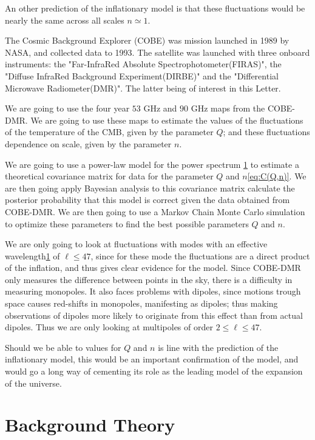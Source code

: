 \documentclass{emulateapj}
\begin{document}
An other prediction of the inflationary model is that these fluctuations would be nearly the same across all scales $n\simeq1$\citep{zeldovich}. 

The Cosmic Background Explorer (COBE) was mission launched in 1989 by NASA, and collected data to 1993. The satellite was launched with three onboard instruments: the "Far-InfraRed Absolute Spectrophotometer(FIRAS)", the "Diffuse InfraRed Background Experiment(DIRBE)" and the "Differential Microwave Radiometer(DMR)". The latter being of interest in this Letter.

We are going to use the four year $53$ GHz and $90$ GHz maps from the COBE-DMR. We are going to use these maps to estimate the values of the fluctuations of the temperature of the CMB, given by the parameter $Q$; and these fluctuations dependence on scale, given by the parameter $n$.

We are going to use a power-law model for the power spectrum \ref{sec:theory} to estimate a theoretical covariance matrix for data for the parameter $Q$ and $n$\eqref{eq:C(Q,n)}. We are then going apply Bayesian analysis to this covariance matrix calculate the posterior probability that this model is correct given the data obtained from COBE-DMR. We are then going to use a Markov Chain Monte Carlo simulation to optimize these parameters to find the best possible parameters $Q$ and $n$. 

We are only going to look at fluctuations with modes with an effective wavelength\ref{sec:theory} of $\ell \leq 47$, since for these mode the fluctuations are a direct product of the inflation, and thus gives clear evidence for the model. Since COBE-DMR only measures the difference between points in the sky, there is a difficulty in measuring monopoles. It also faces problems with dipoles, since motions trough space causes red-shifts in monopoles, manifesting as dipoles; thus making observations of dipoles more likely to originate from this effect than from actual dipoles. Thus we are only looking at multipoles of order $2 \leq \ell \leq 47$.

Should we be able to values for $Q$ and $n$ is line with the prediction of the inflationary model, this would be an important confirmation of the model, and would go a long way of cementing its role as the leading model of the expansion of the universe.


\section{Background Theory}
\label{sec:theory}
\end{document}
